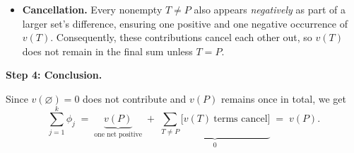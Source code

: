 \documentclass{article}
\begin{document}
\begin{proofsketch}
\begin{itemize}
    \item \textbf{Cancellation.} 
    Every nonempty \(T \neq P\) also appears \emph{negatively} as part of a larger set’s difference, ensuring one positive and one negative occurrence of $v(T)$. Consequently, these contributions cancel each other out, so \(v(T)\) does not remain in the final sum unless $T=P$.
\end{itemize}
\medskip
\noindent
\textbf{Step 4: Conclusion.}

Since $v(\varnothing) = 0$ does not contribute and $v(P)$ remains once in total, we get
\[
\sum_{j=1}^k \phi_j 
\;=\;
\underbrace{v(P)}_{\text{one net positive}} 
\;+\; 
\underbrace{\sum_{T \neq P} \bigl[v(T)\ \text{terms cancel}\bigr]}_{0} 
\;=\;
v(P).
\]
\qedhere
\end{proofsketch}






\end{document}
